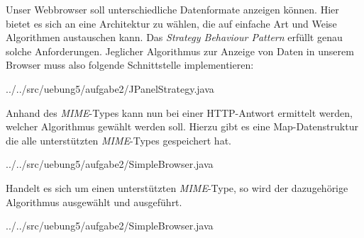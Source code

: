 Unser Webbrowser soll unterschiedliche Datenformate anzeigen können.
Hier bietet es sich an eine Architektur zu wählen, die auf einfache Art und Weise Algorithmen austauschen kann.
Das \textit{Strategy Behaviour Pattern} erfüllt genau solche Anforderungen.
Jeglicher Algorithmus zur Anzeige von Daten in unserem Browser muss also folgende Schnittstelle implementieren:


{../../src/uebung5/aufgabe2/JPanelStrategy.java}

Anhand des \textit{MIME}-Types kann nun bei einer HTTP-Antwort ermittelt werden, welcher Algorithmus gewählt werden soll.
Hierzu gibt es eine Map-Datenstruktur die alle unterstützten \textit{MIME}-Types gespeichert hat.

{../../src/uebung5/aufgabe2/SimpleBrowser.java}

Handelt es sich um einen unterstützten \textit{MIME}-Type, so wird der dazugehörige Algorithmus ausgewählt und ausgeführt.

{../../src/uebung5/aufgabe2/SimpleBrowser.java}
